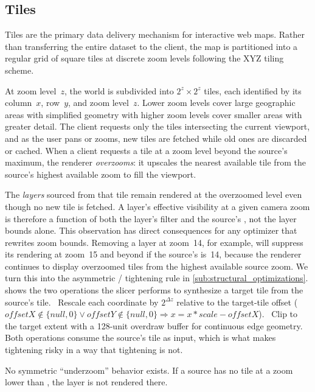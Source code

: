 \subsection{Tiles}\label{sec:tiles}

Tiles are the primary data delivery mechanism for interactive web maps.
Rather than transferring the entire dataset to the client, the map is partitioned into a regular grid of square tiles at discrete zoom levels following the XYZ tiling scheme.

At zoom level~$z$, the world is subdivided into $2^z \times 2^z$ tiles, each identified by its column~$x$, row~$y$, and zoom level~$z$.
Lower zoom levels cover large geographic areas with simplified geometry with higher zoom levels cover smaller areas with greater detail.
The client requests only the tiles intersecting the current viewport, and as the user pans or zooms, new tiles are fetched while old ones are discarded or cached.
When a client requests a tile at a zoom level beyond the source's maximum, the renderer \emph{overzooms}: it upscales the nearest available tile from the source's highest available zoom to fill the viewport.

The \emph{layers} sourced from that tile remain rendered at the overzoomed level even though no new tile is fetched.
A layer's effective visibility at a given camera zoom is therefore a function of both the layer's filter and the source's , not the layer bounds alone.
This observation has direct consequences for any optimizer that rewrites zoom bounds.
Removing a layer at zoom~14, for example, will suppress its rendering at zoom~15 and beyond if the source's  is~14, because the renderer continues to display overzoomed tiles from the highest available source zoom.
We turn this into the asymmetric /  tightening rule in \cref{sub:structural_optimizations}.
 shows the two operations the slicer performs to synthesize a target tile from the source's  tile.
~Rescale each coordinate by $2^{\Delta z}$ relative to the target-tile offset ($offsetX \notin \{null,0\} \lor offsetY \notin \{null,0\} \Rightarrow x = x * scale - offsetX$). ~Clip to the target extent with a 128-unit overdraw buffer for continuous edge geometry.
Both operations consume the source's  tile as input, which is what makes  tightening risky in a way that  tightening is not.

No symmetric \enquote{underzoom} behavior exists.
If a source has no tile at a zoom lower than , the layer is not rendered there.

